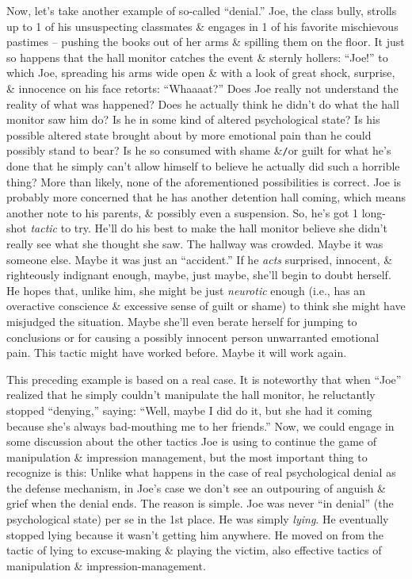 \documentclass{article}
\numberwithin{equation}{section}
\begin{document}
Now, let's take another example of so-called ``denial.'' Joe, the class bully, strolls up to 1 of his unsuspecting classmates \& engages in 1 of his favorite mischievous pastimes -- pushing the books out of her arms \& spilling them on the floor. It just so happens that the hall monitor catches the event \& sternly hollers: ``Joe!'' to which Joe, spreading his arms wide open \& with a look of great shock, surprise, \& innocence on his face retorts: ``Whaaaat?'' Does Joe really not understand the reality of what was happened? Does he actually think he didn't do what the hall monitor saw him do? Is he in some kind of altered psychological state? Is his possible altered state brought about by more emotional pain than he could possibly stand to bear? Is he so consumed with shame \&\texttt{/}or guilt for what he's done that he simply can't allow himself to believe he actually did such a horrible thing? More than likely, none of the aforementioned possibilities is correct. Joe is probably more concerned that he has another detention hall coming, which means another note to his parents, \& possibly even a suspension. So, he's got 1 long-shot \textit{tactic} to try. He'll do his best to make the hall monitor believe she didn't really see what she thought she saw. The hallway was crowded. Maybe it was someone else. Maybe it was just an ``accident.'' If he \textit{acts} surprised, innocent, \& righteously indignant enough, maybe, just maybe, she'll begin to doubt herself. He hopes that, unlike him, she might be just \textit{neurotic} enough (i.e., has an overactive conscience \& excessive sense of guilt or shame) to think she might have misjudged the situation. Maybe she'll even berate herself for jumping to conclusions or for causing a possibly innocent person unwarranted emotional pain. This tactic might have worked before. Maybe it will work again.

This preceding example is based on a real case. It is noteworthy that when ``Joe'' realized that he simply couldn't manipulate the hall monitor, he reluctantly stopped ``denying,'' saying: ``Well, maybe I did do it, but she had it coming because she's always bad-mouthing me to her friends.'' Now, we could engage in some discussion about the other tactics Joe is using to continue the game of manipulation \& impression management, but the most important thing to recognize is this: Unlike what happens in the case of real psychological denial as the defense mechanism, in Joe's case we don't see an outpouring of anguish \& grief when the denial ends. The reason is simple. Joe was never ``in denial'' (the psychological state) per se in the 1st place. He was simply \textit{lying}. He eventually stopped lying because it wasn't getting him anywhere. He moved on from the tactic of lying to excuse-making \& playing the victim, also effective tactics of manipulation \& impression-management.
\end{document}
